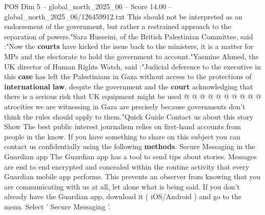 \begin{textsample}{POS Dim 5 – global\_north\_2025\_06 – Score 14.00 – global\_north\_2025\_06/126459912.txt}
This should not be interpreted as an endorsement of the government, but rather a restrained approach to the separation of powers."Sara Husseini, of the British Palestinian Committee, said :"Now the \textbf{courts} have kicked the issue back to the ministers, it is a matter for MPs and the electorate to hold the government to account."Yasmine Ahmed, the UK director of Human Rights Watch, said :"Judicial deference to the executive in this \textbf{case} has left the Palestinians in Gaza without access to the protections of \textbf{international} \textbf{law}, despite the government and the \textbf{court} acknowledging that there is a serious risk that UK equipment might be used @ @ @ @ @ @ @ @ @ @ atrocities we are witnessing in Gaza are precisely because governments don't think the rules should apply to them."Quick Guide Contact us about this story Show The best public interest journalism relies on first-hand accounts from people in the know.
If you have something to share on this subject you can contact us confidentially using the following \textbf{methods}.
Secure Messaging in the Guardian app The Guardian app has a tool to send tips about stories.
Messages are end to end encrypted and concealed within the routine activity that every Guardian mobile app performs.
This prevents an observer from knowing that you are communicating with us at all, let alone what is being said.
If you don't already have the Guardian app, download it ( iOS/Android ) and go to the menu.
Select ' Secure Messaging '.

\end{textsample}
